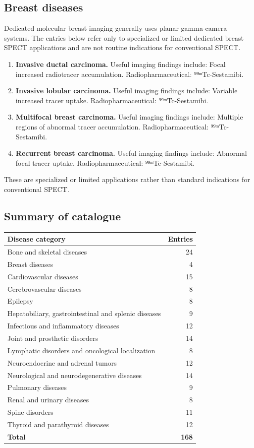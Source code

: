 \subsection{Breast diseases}
Dedicated molecular breast imaging generally uses planar gamma-camera systems. The entries below refer only to specialized or limited dedicated breast SPECT applications and are not routine indications for conventional SPECT.
\begin{enumerate}[leftmargin=*,itemsep=0.45em,topsep=0.4em]
\item \textbf{Invasive ductal carcinoma.} Useful imaging findings include: Focal increased radiotracer accumulation. Radiopharmaceutical: ⁹⁹ᵐTc-Sestamibi.
\item \textbf{Invasive lobular carcinoma.} Useful imaging findings include: Variable increased tracer uptake. Radiopharmaceutical: ⁹⁹ᵐTc-Sestamibi.
\item \textbf{Multifocal breast carcinoma.} Useful imaging findings include: Multiple regions of abnormal tracer accumulation. Radiopharmaceutical: ⁹⁹ᵐTc-Sestamibi.
\item \textbf{Recurrent breast carcinoma.} Useful imaging findings include: Abnormal focal tracer uptake. Radiopharmaceutical: ⁹⁹ᵐTc-Sestamibi.
\end{enumerate}
These are specialized or limited applications rather than standard indications for conventional SPECT.

\subsection{Summary of catalogue}
\begin{center}
\begin{tabular}{@{}p{}r@{}}
\toprule
\textbf{Disease category} & \textbf{Entries} \\
\midrule
Bone and skeletal diseases & 24 \\
Breast diseases & 4 \\
Cardiovascular diseases & 15 \\
Cerebrovascular diseases & 8 \\
Epilepsy & 8 \\
Hepatobiliary, gastrointestinal and splenic diseases & 9 \\
Infectious and inflammatory diseases & 12 \\
Joint and prosthetic disorders & 14 \\
Lymphatic disorders and oncological localization & 8 \\
Neuroendocrine and adrenal tumors & 12 \\
Neurological and neurodegenerative diseases & 14 \\
Pulmonary diseases & 9 \\
Renal and urinary diseases & 8 \\
Spine disorders & 11 \\
Thyroid and parathyroid diseases & 12 \\
\midrule
\textbf{Total} & \textbf{168} \\
\bottomrule
\end{tabular}
\end{center}

